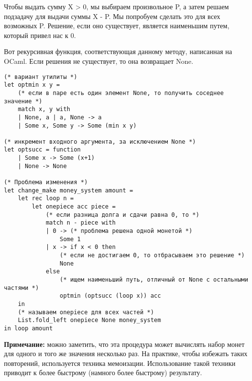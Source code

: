 \vspace{\baselineskip}
Чтобы выдать сумму X > 0, мы выбираем произвольное P, а затем решаем подзадачу для выдачи суммы X - P. Мы попробуем сделать это для всех возможных P. Решение, если оно существует, является наименьшим путем, который привел нас к 0.

\vspace{\baselineskip}
Вот рекурсивная функция, соответствующая данному методу, написанная на OCaml. Если решения не существует, то она возвращает None.

\vspace{\baselineskip}
\begin{tcolorbox}
\begin{verbatim}
(* вариант утилиты *)
let optmin x y =
	(* если в паре есть один элемент None, то получить соседнее значение *)
	match x, y with
	| None, a | a, None -> a
	| Some x, Some y -> Some (min x y)

(* инкремент входного аргумента, за исключением None *)
let optsucc = function
	| Some x -> Some (x+1)
	| None -> None

(* Проблема изменения *)
let change_make money_system amount =
	let rec loop n =
		let onepiece acc piece =
			(* если разница долга и сдачи равна 0, то *)
			match n - piece with
			| 0 -> (* проблема решена одной монетой *)
				Some 1
			| x -> if x < 0 then
				(* если не достигаем 0, то отбрасываем это решение *)
				None
			else
				(* ищем наименьший путь, отличный от None с остальными частями *)
				optmin (optsucc (loop x)) acc
	in
	(* называем onepiece для всех частей *)
	List.fold_left onepiece None money_system
in loop amount
\end{verbatim}
\end{tcolorbox}

\vspace{\baselineskip}
{\bfseries Примечание:} можно заметить, что эта процедура может вычислять набор монет для одного и того же значения несколько раз. На практике, чтобы избежать таких повторений, используется техника мемоизации. Использование такой техники приводит к более быстрому (намного более быстрому) результату.

